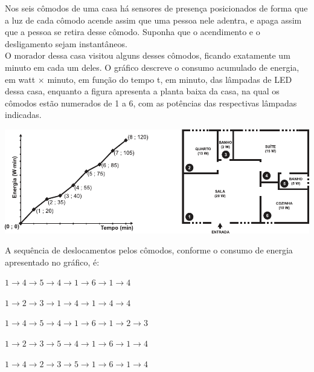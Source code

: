 \questao
Nos seis cômodos de uma casa há sensores de presença posicionados de forma que a luz de cada cômodo acende assim que uma pessoa nele adentra, e apaga assim que a pessoa se retira desse cômodo. Suponha que o acendimento e o desligamento sejam instantâneos.\\
O morador dessa casa visitou alguns desses cômodos, ficando exatamente um minuto em cada um deles. O gráfico descreve o consumo acumulado de energia, em watt $\times$ minuto, em função do tempo t, em minuto, das lâmpadas de LED dessa casa, enquanto a figura apresenta a planta baixa da casa, na qual os cômodos estão numerados de 1 a 6, com as potências das respectivas lâmpadas indicadas.
\begin{center}
\includegraphics[width=\columnwidth]{subareas/ciencias_natureza/fisica-6.pdf}
\end{center}
A sequência de deslocamentos pelos cômodos, conforme o consumo de energia apresentado no gráfico, é:
\begin{alternativas}
\item $1 \to 4 \to 5 \to 4 \to 1 \to 6 \to 1 \to 4$
\item $1 \to 2 \to 3 \to 1 \to 4 \to 1 \to 4 \to 4$
\item $1 \to 4 \to 5 \to 4 \to 1 \to 6 \to 1 \to 2 \to 3$
\item $1 \to 2 \to 3 \to 5 \to 4 \to 1 \to 6 \to 1 \to 4$
\item $1 \to 4 \to 2 \to 3 \to 5 \to 1 \to 6 \to 1 \to 4$
\end{alternativas}

